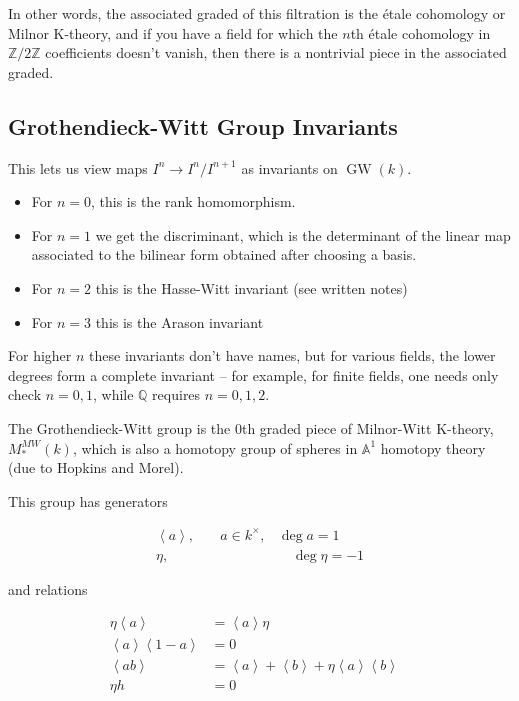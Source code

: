In other words, the associated graded of this filtration is the étale
cohomology or Milnor K-theory, and if you have a field for which the
\(n\)th étale cohomology in \({\mathbb{Z}}/2{\mathbb{Z}}\) coefficients
doesn't vanish, then there is a nontrivial piece in the associated
graded.

\hypertarget{grothendieck-witt-group-invariants}{%
\subsection{Grothendieck-Witt Group
Invariants}\label{grothendieck-witt-group-invariants}}

This lets us view maps \(I^n \to I^n/I^{n+1}\) as invariants on
\({\operatorname{GW}}(k)\).

\begin{itemize}
\tightlist
\item
  For \(n=0\), this is the rank homomorphism.
\item
  For \(n=1\) we get the discriminant, which is the determinant of the
  linear map associated to the bilinear form obtained after choosing a
  basis.
\item
  For \(n=2\) this is the Hasse-Witt invariant (see written notes)
\item
  For \(n=3\) this is the Arason invariant
\end{itemize}

For higher \(n\) these invariants don't have names, but for various
fields, the lower degrees form a complete invariant -- for example, for
finite fields, one needs only check \(n=0,1\), while \({\mathbb{Q}}\)
requires \(n=0,1,2\).

The Grothendieck-Witt group is the 0th graded piece of Milnor-Witt
K-theory, \(M_*^{MW}(k)\), which is also a homotopy group of spheres in
\({\mathbb{A}}^1\) homotopy theory (due to Hopkins and Morel).

This group has generators

\begin{align*} \left\langle{a}\right\rangle, &\quad a\in k^\times, &\deg a = 1\\ \eta, & & \quad\deg \eta = -1 \end{align*}

and relations

\begin{align*} \eta \left\langle{a}\right\rangle &= \left\langle{a}\right\rangle \eta\\ \left\langle{a}\right\rangle\left\langle{1-a}\right\rangle &= 0&\\ \left\langle{ab}\right\rangle &= \left\langle{a}\right\rangle + \left\langle{b}\right\rangle + \eta \left\langle{a}\right\rangle\left\langle{b}\right\rangle\\ \eta h &= 0 \end{align*}

